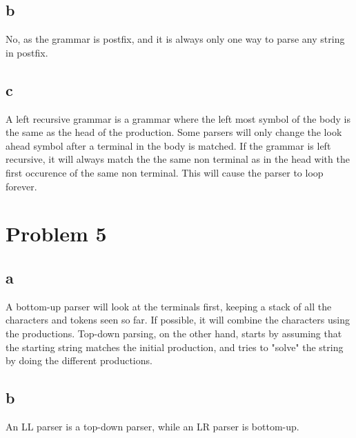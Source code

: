 \documentclass{article}
\begin{document}
\subsection*{b}
No, as the grammar is postfix, and it is always only one way to parse any string in postfix.

\subsection*{c}
A left recursive grammar is a grammar where the left most symbol of the body is the same as 
the head of the production. Some parsers will only change the look ahead symbol after a terminal
in the body is matched. If the grammar is left recursive, it will always match the the same non 
terminal as in the head with the first occurence of the same non terminal. This will cause the
parser to loop forever.


\section*{Problem 5}
\subsection*{a}
A bottom-up parser will look at the terminals first, keeping a stack of all the characters and
tokens seen so far. If possible, it will combine the characters using the productions. Top-down
parsing, on the other hand, starts by assuming that the starting string matches the initial 
production, and tries to "solve" the string by doing the different productions.

\subsection*{b}
An LL parser is a top-down parser, while an LR parser is bottom-up.
\end{document}
